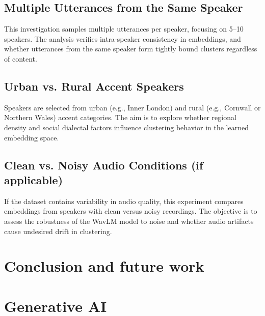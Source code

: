 \documentclass[conference]{IEEEtran}
\begin{document}
\subsection{Multiple Utterances from the Same Speaker}
This investigation samples multiple utterances per speaker, focusing on 5–10 speakers. The analysis verifies intra-speaker consistency in embeddings, and whether utterances from the same speaker form tightly bound clusters regardless of content.

\subsection{Urban vs. Rural Accent Speakers}
Speakers are selected from urban (e.g., Inner London) and rural (e.g., Cornwall or Northern Wales) accent categories. The aim is to explore whether regional density and social dialectal factors influence clustering behavior in the learned embedding space.

\subsection{Clean vs. Noisy Audio Conditions (if applicable)}
If the dataset contains variability in audio quality, this experiment compares embeddings from speakers with clean versus noisy recordings. The objective is to assess the robustness of the WavLM model to noise and whether audio artifacts cause undesired drift in clustering.


\section{Conclusion and future work}




\section*{Generative AI}

\printbibliography


	
\end{document}
